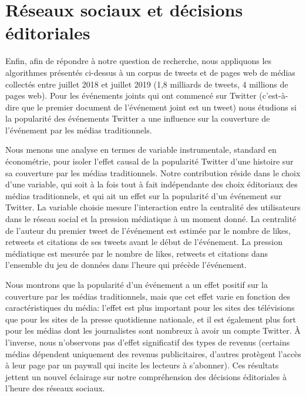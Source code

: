 \section*{Réseaux sociaux et décisions éditoriales}
Enfin, afin de répondre à notre question de recherche, nous appliquons les algorithmes présentés ci-dessus à un corpus de tweets et de pages web de médias collectés entre juillet 2018 et juillet 2019 (1,8 milliards de tweets, 4 millions de pages web). Pour les événements joints qui ont commencé sur Twitter (c'est-à-dire que le premier document de l'événement joint est un tweet) nous étudions si la popularité des événements Twitter a une influence sur la couverture de l'événement par les médias traditionnels.

Nous menons une analyse en termes de variable instrumentale, standard en économétrie, pour isoler l'effet causal de la popularité Twitter d'une histoire sur sa couverture par les médias traditionnels. Notre contribution réside dans le choix d'une variable, qui soit à la fois tout à fait indépendante des choix éditoriaux des médias traditionnels, et qui ait un effet sur la popularité d'un événement sur Twitter. La variable choisie mesure l'interaction entre la centralité des utilisateurs dans le réseau social et la pression médiatique à un moment donné. La centralité de l'auteur du premier tweet de l'événement est estimée par le nombre de likes, retweets et citations de ses tweets avant le début de l'événement. La pression médiatique est mesurée par le nombre de likes, retweets et citations dans l'ensemble du jeu de données dans l'heure qui précède l'événement.

Nous montrons que la popularité d'un événement a un effet positif sur la couverture par les médias traditionnels, mais que cet effet varie en fonction des caractéristiques du média: l'effet est plus important pour les sites des télévisions que pour les sites de la presse quotidienne nationale, et il est également plus fort pour les médias dont les journalistes sont nombreux à avoir un compte Twitter. À l'inverse, nous n'observons pas d'effet significatif des types de revenus (certains médias dépendent uniquement des revenus publicitaires, d'autres protègent l'accès à leur page par un paywall qui incite les lecteurs à s'abonner). Ces résultats jettent un nouvel éclairage sur notre compréhension des décisions éditoriales à l'heure des réseaux sociaux.